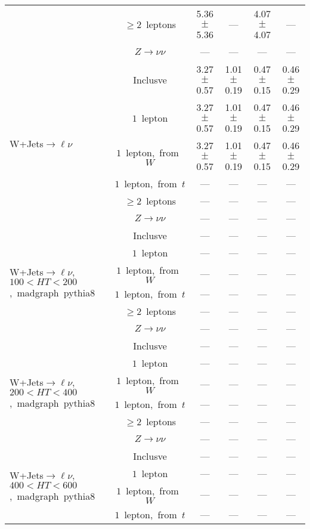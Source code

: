 \documentclass{article}
\begin{document}
\begin{longtable}{|l|c|c|c|c|c|}
 & $\ge2$~leptons  & 5.36 $\pm$ 5.36  & ---  & 4.07 $\pm$ 4.07  & --- \\* 
 & $Z\rightarrow\nu\nu$  & ---  & ---  & ---  & --- \\* 
\hline 
\multirow{6}{*}{W+Jets$\rightarrow\ell\nu$} & Inclusve  & 3.27 $\pm$ 0.57  & 1.01 $\pm$ 0.19  & 0.47 $\pm$ 0.15  & 0.46 $\pm$ 0.29 \\* 
 & $1$~lepton  & 3.27 $\pm$ 0.57  & 1.01 $\pm$ 0.19  & 0.47 $\pm$ 0.15  & 0.46 $\pm$ 0.29 \\* 
 & $1$~lepton,~from~$W$  & 3.27 $\pm$ 0.57  & 1.01 $\pm$ 0.19  & 0.47 $\pm$ 0.15  & 0.46 $\pm$ 0.29 \\* 
 & $1$~lepton,~from~$t$  & ---  & ---  & ---  & --- \\* 
 & $\ge2$~leptons  & ---  & ---  & ---  & --- \\* 
 & $Z\rightarrow\nu\nu$  & ---  & ---  & ---  & --- \\* 
\hline 
\multirow{6}{*}{W+Jets$\rightarrow\ell\nu$,~$100<HT<200$,~madgraph~pythia8} & Inclusve  & ---  & ---  & ---  & --- \\* 
 & $1$~lepton  & ---  & ---  & ---  & --- \\* 
 & $1$~lepton,~from~$W$  & ---  & ---  & ---  & --- \\* 
 & $1$~lepton,~from~$t$  & ---  & ---  & ---  & --- \\* 
 & $\ge2$~leptons  & ---  & ---  & ---  & --- \\* 
 & $Z\rightarrow\nu\nu$  & ---  & ---  & ---  & --- \\* 
\hline 
\multirow{6}{*}{W+Jets$\rightarrow\ell\nu$,~$200<HT<400$,~madgraph~pythia8} & Inclusve  & ---  & ---  & ---  & --- \\* 
 & $1$~lepton  & ---  & ---  & ---  & --- \\* 
 & $1$~lepton,~from~$W$  & ---  & ---  & ---  & --- \\* 
 & $1$~lepton,~from~$t$  & ---  & ---  & ---  & --- \\* 
 & $\ge2$~leptons  & ---  & ---  & ---  & --- \\* 
 & $Z\rightarrow\nu\nu$  & ---  & ---  & ---  & --- \\* 
\hline 
\multirow{6}{*}{W+Jets$\rightarrow\ell\nu$,~$400<HT<600$,~madgraph~pythia8} & Inclusve  & ---  & ---  & ---  & --- \\* 
 & $1$~lepton  & ---  & ---  & ---  & --- \\* 
 & $1$~lepton,~from~$W$  & ---  & ---  & ---  & --- \\* 
 & $1$~lepton,~from~$t$  & ---  & ---  & ---  & --- \\* 

\end{longtable}
\end{document}
